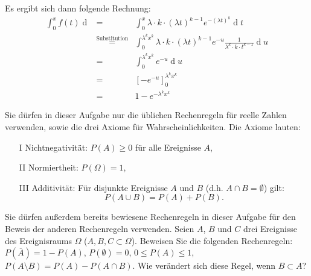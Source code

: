 \begin{Answer}
Es ergibt sich dann folgende Rechnung:
\begin{eqnarray*}
	\int_0^{x}f(t)\operatorname{d}&=&\int_{0}^{x}\lambda\cdot k\cdot (\lambda t)^{k-1}e^{-(\lambda t)^k}\operatorname{d}t\\
	&\stackrel{\text{Substitution}}{=}&\int_0^{\lambda^kx^k} \lambda\cdot k\cdot (\lambda t)^{k-1}e^{-u}\frac{1}{\lambda^k\cdot k\cdot t^{k-1}}\operatorname{d}u\\
	&=&\int_0^{\lambda^kx^k}e^{-u}\operatorname{d}u\\
	&=&\left[-e^{-u}\right]_0^{\lambda^kx^k}\\
	&=&1-e^{-\lambda^kx^k}
\end{eqnarray*}
\end{Answer}


\begin{Exercise} Sie dürfen in dieser Aufgabe nur die üblichen Rechenregeln für reelle Zahlen verwenden, sowie die drei Axiome für Wahrscheinlichkeiten. Die Axiome lauten:
	\begin{itemize}
		\item[I]  Nichtnegativität: $P(A)\geq0$ für alle Ereignisse $A$,
		\item[II] Normiertheit: $P(\Omega)=1$,
		\item[III] Additivität: Für disjunkte Ereignisse $A$ und $B$ (d.h. $A\cap B=\emptyset$) gilt:
		\begin{equation*}
			P(A\cup B)=P(A)+P(B).
		\end{equation*}
	\end{itemize}
	Sie dürfen außerdem bereits bewiesene Rechenregeln in dieser Aufgabe für den Beweis der anderen Rechenregeln verwenden.
	Seien $A$, $B$ und $C$ drei Ereignisse des Ereignisraums $\Omega$ ($A,B,C\subset \Omega$). 
	Beweisen Sie die folgenden Rechenregeln:
	\Question $P(\overline{A})=1-P(A)$,
	\Question $P(\emptyset)=0$,
	\Question $0\leq P(A)\leq1$,
	\Question $P(A\setminus B)=P(A)-P(A\cap B)$. Wie verändert sich diese Regel, wenn $B\subset A$?
\end{Exercise}

